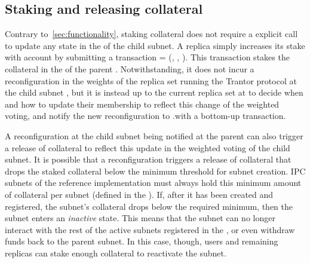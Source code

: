 \subsection{Staking and releasing collateral}
Contrary to~\cref{sec:functionality}, staking collateral does not require a explicit call to update any state in the \gw of the child subnet. A replica simply increases its stake with account  by submitting a transaction  = (, , ). This transaction stakes the collateral in the \gw of the parent . Notwithstanding, it does not incur a reconfiguration in the weights of the replica set running the Trantor protocol at the child subnet , but it is instead up to the current replica set at  to decide when and how to update their membership to reflect this change of the weighted voting, and notify the new reconfiguration to .\gw with a bottom-up transaction. 

A reconfiguration at the child subnet being notified at the parent can also trigger a release of collateral to reflect this update in the weighted voting of the child subnet. It is possible that a reconfiguration triggers a release of collateral that drops the staked collateral below the minimum threshold for subnet creation. IPC subnets of the reference implementation must always hold this minimum amount of collateral per subnet (defined in the \gw). If, after it has been created and registered, the subnet's collateral drops below the required minimum, then the subnet enters an \emph{inactive} state. This means that the subnet can no longer interact with the rest of the active subnets registered in the \gw, or even withdraw funds back to the parent subnet. In this case, though, users and remaining replicas can stake enough collateral to reactivate the subnet. 
